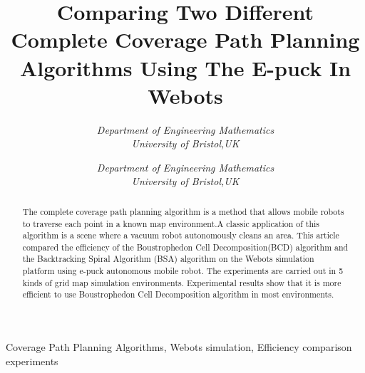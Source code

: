 \documentclass[conference]{IEEEtran}
\begin{document}
\title{Comparing Two Different Complete Coverage Path Planning Algorithms Using The E-puck In Webots}

\author{
  \textit{Department of Engineering Mathematics}\\
  \textit{University of Bristol,UK}
  \and
  \textit{Department of Engineering Mathematics}\\
  \textit{University of Bristol,UK}
}

\maketitle

\begin{abstract}

The complete coverage path planning algorithm is a method that allows mobile robots to traverse each point in a known map environment.A classic application of this algorithm is a scene where a vacuum robot autonomously cleans an area. This article compared the efficiency of the Boustrophedon  Cell  Decomposition(BCD) algorithm and the Backtracking Spiral Algorithm (BSA) algorithm on the Webots simulation platform using e-puck autonomous mobile robot. The experiments are carried out in 5 kinds of grid map simulation environments. Experimental results show that it is more efficient to use Boustrophedon Cell Decomposition algorithm in most environments.

\end{abstract}

\def\IEEEkeywordsname{Keywords} 
\begin{IEEEkeywords} Coverage  Path  Planning Algorithms, Webots simulation, Efficiency comparison experiments 
\end{IEEEkeywords} 
\end{document}
